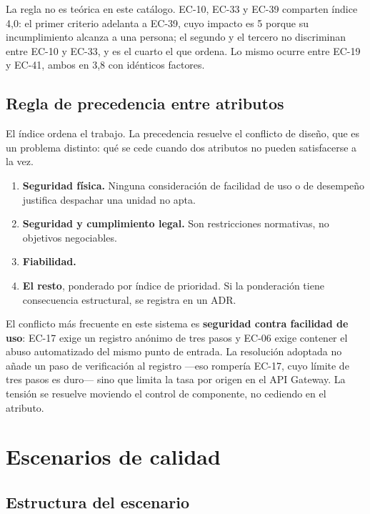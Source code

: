 \documentclass[11pt,a4paper]{article}
\begin{document}
\noindent La regla no es teórica en este catálogo. EC-10, EC-33 y EC-39 comparten índice 4,0: el primer criterio adelanta a EC-39, cuyo impacto es 5 porque su incumplimiento alcanza a una persona; el segundo y el tercero no discriminan entre EC-10 y EC-33, y es el cuarto el que ordena. Lo mismo ocurre entre EC-19 y EC-41, ambos en 3,8 con idénticos factores.

\subsection{Regla de precedencia entre atributos}

El índice ordena el trabajo. La precedencia resuelve el conflicto de diseño, que es un problema distinto: qué se cede cuando dos atributos no pueden satisfacerse a la vez.

\begin{enumerate}
\item \textbf{Seguridad física.} Ninguna consideración de facilidad de uso o de desempeño justifica despachar una unidad no apta.
\item \textbf{Seguridad y cumplimiento legal.} Son restricciones normativas, no objetivos negociables.
\item \textbf{Fiabilidad.}
\item \textbf{El resto}, ponderado por índice de prioridad. Si la ponderación tiene consecuencia estructural, se registra en un ADR.
\end{enumerate}

\noindent El conflicto más frecuente en este sistema es \textbf{seguridad contra facilidad de uso}: EC-17 exige un registro anónimo de tres pasos y EC-06 exige contener el abuso automatizado del mismo punto de entrada. La resolución adoptada no añade un paso de verificación al registro ---eso rompería EC-17, cuyo límite de tres pasos es duro--- sino que limita la tasa por origen en el API Gateway. La tensión se resuelve moviendo el control de componente, no cediendo en el atributo.

\section{Escenarios de calidad}
\label{sec:escenarios}

\subsection{Estructura del escenario}
\end{document}
